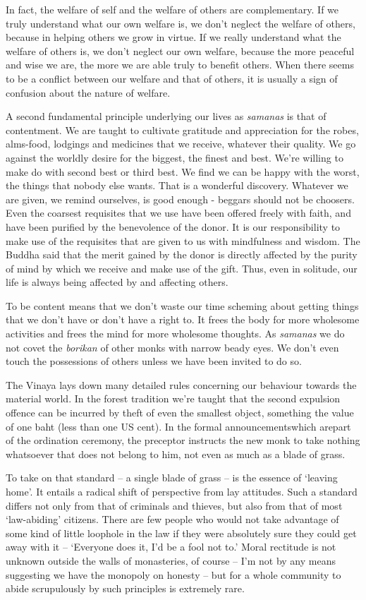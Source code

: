 In fact, the welfare of self and the welfare of others are
complementary. If we truly understand what our own welfare is, we don't
neglect the welfare of others, because in helping others we grow in
virtue. If we really understand what the welfare of others is, we don't
neglect our own welfare, because the more peaceful and wise we are, the
more we are able truly to benefit others. When there seems to be a
conflict between our welfare and that of others, it is usually a sign of
confusion about the nature of welfare.

A second fundamental principle underlying our lives as \emph{samanas} is
that of contentment. We are taught to cultivate gratitude and
appreciation for the robes, alms-food, lodgings and medicines that we
receive, whatever their quality. We go against the worldly desire for
the biggest, the finest and best. We're willing to make do with second
best or third best. We find we can be happy with the worst, the things
that nobody else wants. That is a wonderful discovery. Whatever we are
given, we remind ourselves, is good enough - beggars should not be
choosers. Even the coarsest requisites that we use have been offered
freely with faith, and have been purified by the benevolence of the
donor. It is our responsibility to make use of the requisites that are
given to us with mindfulness and wisdom. The Buddha said that the merit
gained by the donor is directly affected by the purity of mind by which
we receive and make use of the gift. Thus, even in solitude, our life is
always being affected by and affecting others.

To be content means that we don't waste our time scheming about getting
things that we don't have or don't have a right to. It frees the body
for more wholesome activities and frees the mind for more wholesome
thoughts. As \emph{samanas} we do not covet the \emph{borikan} of other
monks with narrow beady eyes. We don't even touch the possessions of
others unless we have been invited to do so.

The Vinaya lays down many detailed rules concerning our behaviour
towards the material world. In the forest tradition we're taught that
the second expulsion offence can be incurred by theft of even the
smallest object, something the value of one baht (less than one US
cent). In the formal announcementswhich arepart of the ordination
ceremony, the preceptor instructs the new monk to take nothing
whatsoever that does not belong to him, not even as much as a blade of
grass.

To take on that standard -- a single blade of grass -- is the essence
of `leaving home'. It entails a radical shift of perspective from lay
attitudes. Such a standard differs not only from that of criminals and
thieves, but also from that of most `law-abiding' citizens. There are
few people who would not take advantage of some kind of little loophole
in the law if they were absolutely sure they could get away with it --
`Everyone does it, I'd be a fool not to.' Moral rectitude is not unknown
outside the walls of monasteries, of course -- I'm not by any means
suggesting we have the monopoly on honesty -- but for a whole community
to abide scrupulously by such principles is extremely rare.


